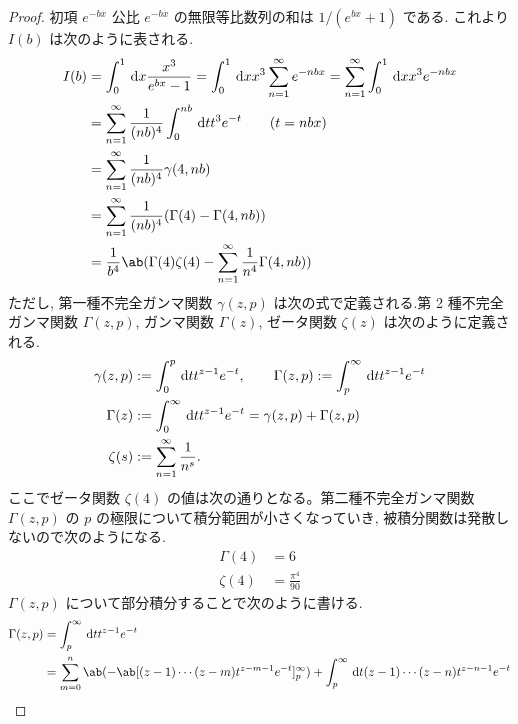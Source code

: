 \documentclass[a4paper,11pt]{jlreq}
\begin{document}
\begin{proof}
  初項 $e^{-bx}$ 公比 $e^{-bx}$ の無限等比数列の和は $1/(e^{bx} + 1)$ である. これより $I(b)$ は次のように表される.
  \begin{align}
    I(b) & = \int_0^1\dl{x}\frac{x^3}{e^{bx} - 1} = \int_0^1\dl{x}x^3\sum_{n=1}^{\infty}e^{-nbx} = \sum_{n=1}^{\infty}\int_0^1\dl{x}x^3e^{-nbx} \\
         & = \sum_{n=1}^{\infty}\frac{1}{(nb)^4}\int_0^{nb}\dl{t}t^3e^{-t} \qquad (t = nbx)                                                     \\
         & = \sum_{n=1}^{\infty}\frac{1}{(nb)^4}\gamma(4, nb)                                                                                   \\
         & = \sum_{n=1}^{\infty}\frac{1}{(nb)^4}(\Gamma(4) - \Gamma(4, nb))                                                                     \\
         & = \frac{1}{b^4}\ab(\Gamma(4)\zeta(4) - \sum_{n=1}^{\infty}\frac{1}{n^4}\Gamma(4, nb))
  \end{align}
  ただし, 第一種不完全ガンマ関数 $\gamma(z, p)$ は次の式で定義される.第 2 種不完全ガンマ関数 $\Gamma(z, p)$, ガンマ関数 $\Gamma(z)$, ゼータ関数 $\zeta(z)$ は次のように定義される.
  \begin{align}
    \gamma(z, p) & := \int_0^p\dl{t}t^{z-1}e^{-t}, \qquad \Gamma(z, p) := \int_p^\infty\dl{t}t^{z-1}e^{-t} \\
    \Gamma(z)    & := \int_0^\infty\dl{t}t^{z-1}e^{-t} = \gamma(z, p) + \Gamma(z, p)                       \\
    \zeta(s)     & := \sum_{n=1}^{\infty}\frac{1}{n^s}.
  \end{align}
  ここでゼータ関数 $\zeta(4)$ の値は次の通りとなる。第二種不完全ガンマ関数 $\Gamma(z,p)$ の $p$ の極限について積分範囲が小さくなっていき, 被積分関数は発散しないので次のようになる.
  \begin{align}
    \Gamma(4) & = 6                \\
    \zeta(4)  & = \frac{\pi^4}{90}
  \end{align}
  $\Gamma(z, p)$ について部分積分することで次のように書ける.
  \begin{align}
    \Gamma(z, p) & = \int_p^\infty\dl{t}t^{z-1}e^{-t}                                                                                      \\
                 & = \sum_{m=0}^n\ab(-\ab[(z-1)\cdots(z-m)t^{z-m-1}e^{-t}]_p^\infty) + \int_p^\infty\dl{t} (z-1)\cdots(z-n)t^{z-n-1}e^{-t} \\

\end{align}
\end{proof}
\end{document}
